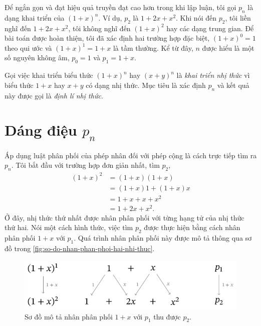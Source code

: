 \documentclass[12pt]{article} %
\begin{document}
Để ngắn gọn và đạt hiệu quả truyền đạt cao hơn trong khi lập luận, tôi gọi \(p_n\) là dạng khai triển của \((1+x)^n\). Ví dụ, \(p_2\) là \(1+2x+x^2\). Khi nói đến \(p_2\), tôi liền nghĩ đến \(1+2x+x^2\), tôi không nghĩ đến \((1+x)^2\) hay các dạng trung gian. Để bài toán được hoàn thiện, tôi đã xác định hai trường hợp đặc biệt, \((1+x)^0=1\) theo qui ước và \((1+x)^1=1+x\) là tầm thường. Kể từ đây, \(n\) được hiểu là một số nguyên không âm, \(p_0=1\) và \(p_1=1+x\).

Gọi việc khai triển biểu thức \((1+x)^n\) hay \((x+y)^n\) là \emph{khai triển nhị thức} vì biểu thức \(1+x\) hay \(x+y\) có dạng nhị thức. Mục tiêu là xác định \(p_n\) và kết quả này được gọi là \emph{định lí nhị thức}.


\section{Dáng điệu \texorpdfstring{\protect\(p_n\)}{dạng khai tiển lũy thừa nhị thức}}
Áp dụng luật phân phối của phép nhân đối với phép cộng là cách trực tiếp tìm ra \(p_n\). Tôi bắt đầu với trường hợp đơn giản nhất, tìm \(p_2\),
\begin{align*}
    (1+x)^2
        & = (1+x)(1+x) \\
        & = (1+x)1 + (1+x)x \\
        & = 1 + x + x +x^2 \\
        & = 1 + 2x + x^2.
\end{align*}
Ở đây, nhị thức thứ nhất được nhân phân phối với từng hạng tử của nhị thức thứ hai. Nói một cách hình thức, việc tìm \(p_2\) được thực hiện bằng cách nhân phân phối \(1+x\) với \(p_1\). Quá trình nhân phân phối này được mô tả thông qua sơ đồ trong \autoref{fig:so-do-nhan-phan-phoi-hai-nhi-thuc}.

\begin{figure}[htbp]
    \centering
    \includegraphics*[scale=1]{./tex-images/so-do-nhan-phan-phoi-hai-nhi-thuc/so-do-nhan-phan-phoi-hai-nhi-thuc.pdf}
    \caption{Sơ đồ mô tả nhân phân phối \(1+x\) với \(p_1\) thu được \(p_2\).}
    \label{fig:so-do-nhan-phan-phoi-hai-nhi-thuc}
\end{figure}
\end{document}

